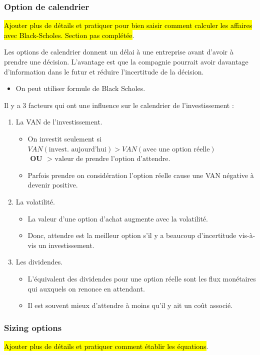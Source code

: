 \documentclass[10pt, french]{article}
\begin{document}
\begin{multicols*}{2}
\subsubsection{Option de calendrier}
\hl{Ajouter plus de détails et pratiquer pour bien saisir comment calculer les affaires avec Black-Scholes. Section pas complétée}.

Les options de calendrier donnent un délai à une entreprise avant d'avoir à prendre une décision. L'avantage est que la compagnie pourrait avoir davantage d'information dans le futur et réduire l'incertitude de la décision.
\begin{itemize}
	\item	On peut utiliser formule de Black Scholes.
\end{itemize}

Il y a 3 facteurs qui ont une influence sur le calendrier de l'investissement :
\begin{enumerate}
	\item	La VAN de l'investissement.
		\begin{itemize}
		\item	On investit seulement si $VAN(\text{invest. aujourd'hui}) > VAN(\text{avec une option réelle})$ $\textbf{ OU } \text{ > valeur de prendre l'option d'attendre}$.
		\item	Parfois prendre on considération l'option réelle cause une VAN négative à devenir positive.
		\end{itemize}
	\item	La volatilité.
		\begin{itemize}
		\item	La valeur d'une option d'achat augmente avec la volatilité.
		\item	Donc, attendre est la meilleur option s'il y a beaucoup d'incertitude vis-à-vis un investissement.
		\end{itemize}
	\item	Les dividendes.
		\begin{itemize}
		\item	L'équivalent des dividendes pour une option réelle sont les flux monétaires qui auxquels on renonce en attendant.
		\item	Il est souvent mieux d'attendre à moins qu'il y ait un coût associé.
		\end{itemize}
\end{enumerate}


\subsubsection{Sizing options}
\hl{Ajouter plus de détails et pratiquer comment établir les équations}.


\end{multicols*}
\end{document}
